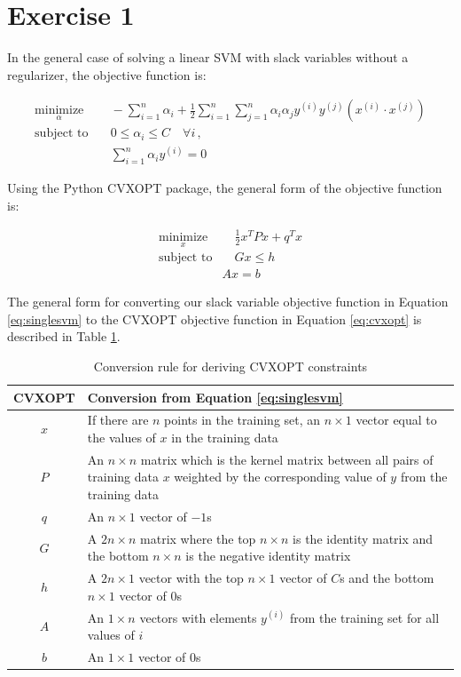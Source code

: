 \documentclass[10pt]{article}
\begin{document}
\section{Exercise 1}

In the general case of solving a linear SVM with slack variables without a regularizer, the objective function is:

\begin{subequations}
\begin{align}
	\underset{\alpha}{\text{minimize}}
		& \quad -\sum_{i = 1}^n \alpha_i + \frac{1}{2} \sum_{i = 1}^n \sum_{j = 1}^n \alpha_i \alpha_j y^{(i)} y^{(j)} (x^{(i)} \cdot x^{(j)}) \\
	\text{subject to}
		& \quad 0 \leq \alpha_i \leq C \quad \forall i \,, \\
		& \quad \sum_{i = 1}^n \alpha_i y^{(i)} = 0
\end{align}
\label{eq:singlesvm}
\end{subequations}

Using the Python CVXOPT package, the general form of the objective function is:

\begin{subequations}
\begin{align}
	\underset{x}{\text{minimize}}
		& \quad \frac{1}{2}x^T P x + q^T x \\
	\text{subject to} 
		& \quad Gx \leq h \\
		& Ax = b
\end{align}
\label{eq:cvxopt}
\end{subequations}

The general form for converting our slack variable objective function in Equation \ref{eq:singlesvm} to the CVXOPT objective function in Equation \ref{eq:cvxopt} is described in Table \ref{tbl:cvxopttosvm}.

\begin{table}[!ht]
\centering
\begin{tabular}{c|p{}}
	CVXOPT& Conversion from Equation \ref{eq:singlesvm} \\ \hline
	$x$ & If there are $n$ points in the training set, an $n \times 1$ vector equal to the values of $x$ in the training data \\
	$P$ & An $n \times n$ matrix which is the kernel matrix between all pairs of training data $x$ weighted by the corresponding value of $y$ from the training data \\
	$q$ & An $n \times 1$ vector of $-1$s \\
	$G$ & A $2n \times n$ matrix where the top $n \times n$ is the identity matrix and the bottom $n \times n$ is the negative identity matrix \\
	$h$ & A $2n \times 1$ vector with the top $n \times 1$ vector of $C$s and the bottom $n \times 1$ vector of $0$s \\
	$A$ & An $1 \times n$ vectors with elements $y^{(i)}$ from the training set for all values of $i$ \\
	$b$ & An $1 \times 1$ vector of $0$s
\end{tabular}
\caption{Conversion rule for deriving CVXOPT constraints}
\label{tbl:cvxopttosvm}
\end{table}
\end{document}

